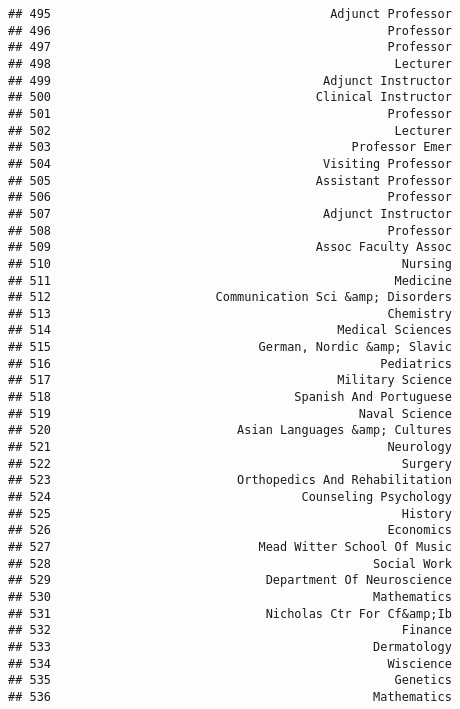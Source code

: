 \documentclass[
]{article}
\begin{document}
\begin{verbatim}
## 495                                       Adjunct Professor
## 496                                               Professor
## 497                                               Professor
## 498                                                Lecturer
## 499                                      Adjunct Instructor
## 500                                     Clinical Instructor
## 501                                               Professor
## 502                                                Lecturer
## 503                                          Professor Emer
## 504                                      Visiting Professor
## 505                                     Assistant Professor
## 506                                               Professor
## 507                                      Adjunct Instructor
## 508                                               Professor
## 509                                     Assoc Faculty Assoc
## 510                                                 Nursing
## 511                                                Medicine
## 512                       Communication Sci &amp; Disorders
## 513                                               Chemistry
## 514                                        Medical Sciences
## 515                             German, Nordic &amp; Slavic
## 516                                              Pediatrics
## 517                                        Military Science
## 518                                  Spanish And Portuguese
## 519                                           Naval Science
## 520                          Asian Languages &amp; Cultures
## 521                                               Neurology
## 522                                                 Surgery
## 523                          Orthopedics And Rehabilitation
## 524                                   Counseling Psychology
## 525                                                 History
## 526                                               Economics
## 527                             Mead Witter School Of Music
## 528                                             Social Work
## 529                              Department Of Neuroscience
## 530                                             Mathematics
## 531                              Nicholas Ctr For Cf&amp;Ib
## 532                                                 Finance
## 533                                             Dermatology
## 534                                               Wiscience
## 535                                                Genetics
## 536                                             Mathematics

\end{verbatim}
\end{document}
